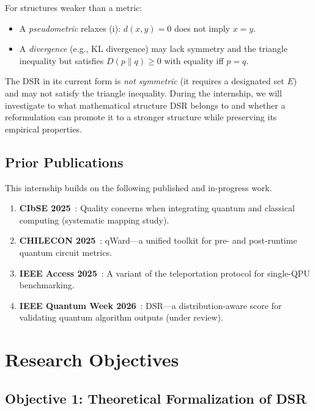 \documentclass[11pt]{article}
\begin{document}
For structures weaker than a metric:
\begin{itemize}
  \item A \emph{pseudometric} relaxes (i): $d(x,y)=0$ does not imply $x=y$.
  \item A \emph{divergence} (e.g., KL divergence) may lack symmetry and the triangle inequality but satisfies $D(p \| q) \geq 0$ with equality iff $p = q$.
\end{itemize}

The DSR in its current form is \emph{not symmetric} (it requires a designated set $E$) and may not satisfy the triangle inequality. During the internship, we will investigate to what mathematical structure DSR belongs to and whether a reformulation can promote it to a stronger structure while preserving its empirical properties.

\subsection{Prior Publications}

This internship builds on the following published and in-progress work.

\begin{enumerate}
  \item \textbf{CIbSE 2025}~\cite{cibse2025}: Quality concerns when integrating quantum and classical computing (systematic mapping study).
  \item \textbf{CHILECON 2025}~\cite{qward2026}: qWard---a unified toolkit for pre- and post-runtime quantum circuit metrics.
  \item \textbf{IEEE Access 2025}~\cite{vTPMarquez_2026}: A variant of the teleportation protocol for single-QPU benchmarking.
  \item \textbf{IEEE Quantum Week 2026}~\cite{dsrPaper2026}: DSR---a distribution-aware score for validating quantum algorithm outputs (under review).
\end{enumerate}

\section{Research Objectives}

\subsection{Objective 1: Theoretical Formalization of DSR}
\end{document}
